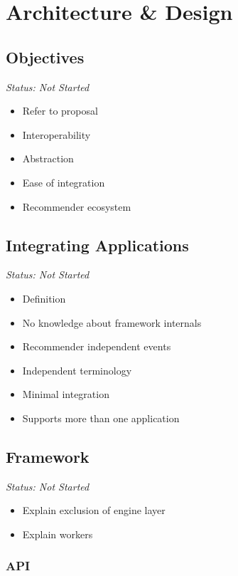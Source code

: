 \chapter{Architecture \& Design}

\section{Objectives}

\emph{Status: Not Started}

\begin{itemize}
\item Refer to proposal
\item Interoperability
\item Abstraction
\item Ease of integration
\item Recommender ecosystem
\end{itemize}

\section{Integrating Applications}

\emph{Status: Not Started}

\begin{itemize}
\item Definition
\item No knowledge about framework internals
\item Recommender independent events
\item Independent terminology
\item Minimal integration
\item Supports more than one application
\end{itemize}

\section{Framework}


\emph{Status: Not Started}

\begin{itemize}
\item Explain exclusion of engine layer
\item Explain workers
\end{itemize}

\subsection{API}

